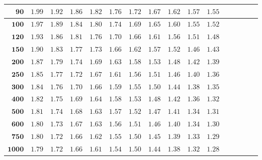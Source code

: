 \begin{customTableWrapper}{1.4}
\begin{longtable}{|r|r|r|r|r|r|r|r|r|r|r|r|r|r|r|r|}
    ${\mathbf{90}}$  & ${1.99}$   & ${1.92}$   & ${1.86}$   & ${1.82}$   & ${1.76}$   & ${1.72}$   & ${1.67}$   & ${1.62}$   & ${1.57}$   & ${1.55}$   \\  \hline 
    ${\mathbf{100}}$  & ${1.97}$   & ${1.89}$   & ${1.84}$   & ${1.80}$   & ${1.74}$   & ${1.69}$   & ${1.65}$   & ${1.60}$   & ${1.55}$   & ${1.52}$   \\  \hline 
    ${\mathbf{120}}$  & ${1.93}$   & ${1.86}$   & ${1.81}$   & ${1.76}$   & ${1.70}$   & ${1.66}$   & ${1.61}$   & ${1.56}$   & ${1.51}$   & ${1.48}$   \\  \hline 
    ${\mathbf{150}}$  & ${1.90}$   & ${1.83}$   & ${1.77}$   & ${1.73}$   & ${1.66}$   & ${1.62}$   & ${1.57}$   & ${1.52}$   & ${1.46}$   & ${1.43}$   \\  \hline 
    ${\mathbf{200}}$  & ${1.87}$   & ${1.79}$   & ${1.74}$   & ${1.69}$   & ${1.63}$   & ${1.58}$   & ${1.53}$   & ${1.48}$   & ${1.42}$   & ${1.39}$   \\  \hline 
    ${\mathbf{250}}$  & ${1.85}$   & ${1.77}$   & ${1.72}$   & ${1.67}$   & ${1.61}$   & ${1.56}$   & ${1.51}$   & ${1.46}$   & ${1.40}$   & ${1.36}$   \\  \hline 
    ${\mathbf{300}}$  & ${1.84}$   & ${1.76}$   & ${1.70}$   & ${1.66}$   & ${1.59}$   & ${1.55}$   & ${1.50}$   & ${1.44}$   & ${1.38}$   & ${1.35}$   \\  \hline 
    ${\mathbf{400}}$  & ${1.82}$   & ${1.75}$   & ${1.69}$   & ${1.64}$   & ${1.58}$   & ${1.53}$   & ${1.48}$   & ${1.42}$   & ${1.36}$   & ${1.32}$   \\  \hline 
    ${\mathbf{500}}$  & ${1.81}$   & ${1.74}$   & ${1.68}$   & ${1.63}$   & ${1.57}$   & ${1.52}$   & ${1.47}$   & ${1.41}$   & ${1.34}$   & ${1.31}$   \\  \hline 
    ${\mathbf{600}}$  & ${1.80}$   & ${1.73}$   & ${1.67}$   & ${1.63}$   & ${1.56}$   & ${1.51}$   & ${1.46}$   & ${1.40}$   & ${1.34}$   & ${1.30}$   \\  \hline 
    ${\mathbf{750}}$  & ${1.80}$   & ${1.72}$   & ${1.66}$   & ${1.62}$   & ${1.55}$   & ${1.50}$   & ${1.45}$   & ${1.39}$   & ${1.33}$   & ${1.29}$   \\  \hline 
    ${\mathbf{1000}}$  & ${1.79}$   & ${1.72}$   & ${1.66}$   & ${1.61}$   & ${1.54}$   & ${1.50}$   & ${1.44}$   & ${1.38}$   & ${1.32}$   & ${1.28}$   \\ \hline

\end{longtable}
\end{customTableWrapper}
\changefontsizes{10pt}


